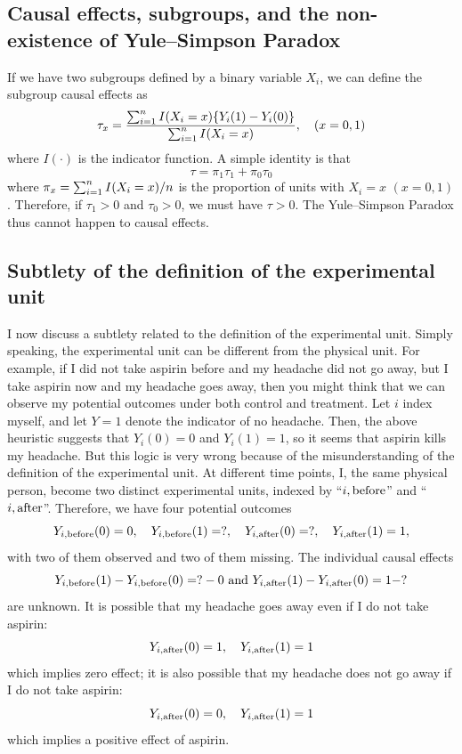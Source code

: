 \subsection{Causal effects, subgroups, and the non-existence of Yule--Simpson Paradox}


If we have two subgroups defined by a binary variable $X_i $, we can define the subgroup causal effects as
$$
\tau_x = \frac{  \sum_{i=1}^n  I(X_i = x) \{  Y_i(1) - Y_i(0) \}    }{   \sum_{i=1}^n  I(X_i = x)    },\quad (x=0,1) 
$$
where $I(\cdot)$ is the indicator function. 
A simple identity is that
$$
\tau =  \pi_1 \tau_1  +  \pi_0 \tau_0
$$
where $\pi_x =  \sum_{i=1}^n  I(X_i = x)  / n$ is the proportion of units with $X_i = x$ $(x=0,1)$. Therefore, if $\tau_1  > 0$ and $ \tau_0 > 0$, we must have $\tau > 0$. The Yule--Simpson Paradox thus cannot happen to causal effects.  



\subsection{Subtlety of the definition of the experimental unit}

I now discuss a subtlety related to the definition of the experimental unit. Simply speaking, the experimental unit can be different from the physical unit. For example, if I did not take aspirin before and my headache did not go away, but I take aspirin now and my headache goes away, then you might think that we can observe my potential outcomes under both control and treatment. Let $i$ index myself, and let $Y=1$ denote the indicator of no headache. Then, the above heuristic suggests that $Y_i(0) = 0$ and $Y_i(1) = 1$, so it seems that aspirin kills my headache. But this logic is very wrong because of the misunderstanding of the definition of the experimental unit. At different time points, I, the same physical person, become two distinct experimental units, indexed by ``$i,\textup{before}$'' and ``$i,\textup{after}$''. Therefore, we have four potential outcomes
$$
Y_{i,\textup{before}}(0)=0, \quad  Y_{i,\textup{before}}(1)=?,\quad
Y_{i,\textup{after}}(0)=?, \quad  Y_{i,\textup{after}}(1)=1,
$$ 
with two of them observed and two of them missing. The individual causal effects 
$$
Y_{i,\textup{before}}(1) -  Y_{i,\textup{before}}(0) = ? - 0 \text{ and } Y_{i,\textup{after}}(1)  - Y_{i,\textup{after}}(0) = 1 - ?
$$ 
are unknown. It is possible that my headache goes away even if I do not take aspirin:
$$
Y_{i,\textup{after}}(0)=1, \quad  Y_{i,\textup{after}}(1)=1
$$
which implies zero effect; it is also possible that my headache does not go away if I do not take aspirin:
$$
Y_{i,\textup{after}}(0)=0, \quad  Y_{i,\textup{after}}(1)=1
$$
which implies a positive effect of aspirin. 

